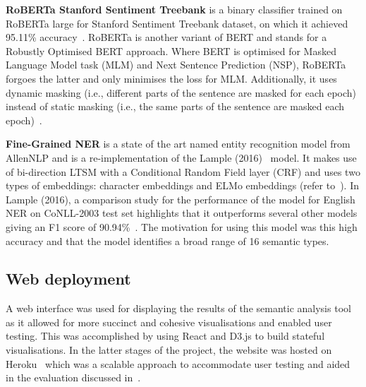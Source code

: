 \textbf{RoBERTa Stanford Sentiment Treebank} is a binary classifier trained on RoBERTa large for Stanford Sentiment Treebank dataset, on which it achieved 95.11\% accuracy~\cite{roberta}. RoBERTa is another variant of BERT and stands for a Robustly Optimised BERT approach. Where BERT is optimised for Masked Language Model task (MLM) and Next Sentence Prediction (NSP), RoBERTa forgoes the latter and only minimises the loss for MLM. Additionally, it uses dynamic masking (i.e., different parts of the sentence are masked for each epoch) instead of static masking (i.e., the same parts of the sentence are masked each epoch)~\cite{roberta}. 

\textbf{Fine-Grained NER} is a state of the art named entity recognition model from AllenNLP and is a re-implementation of the Lample (2016)~\cite{lample} model. It makes use of bi-direction LTSM with a Conditional Random Field layer (CRF) and uses two types of embeddings: character embeddings and ELMo embeddings (refer to~). In Lample (2016), a comparison study for the performance of the model for English NER on CoNLL-2003 test set highlights that it outperforms several other models giving an F1 score of 90.94\%~\cite{lample}. The motivation for using this model was this high accuracy and that the model identifies a broad range of 16 semantic types.

\subsection{Web deployment}
A web interface was used for displaying the results of the semantic analysis tool as it allowed for more succinct and cohesive visualisations and enabled user testing. This was accomplished by using React and D3.js to build stateful visualisations. In the latter stages of the project, the website was hosted on Heroku~\cite{heroku} which was a scalable approach to accommodate user testing and aided in the evaluation discussed in~.